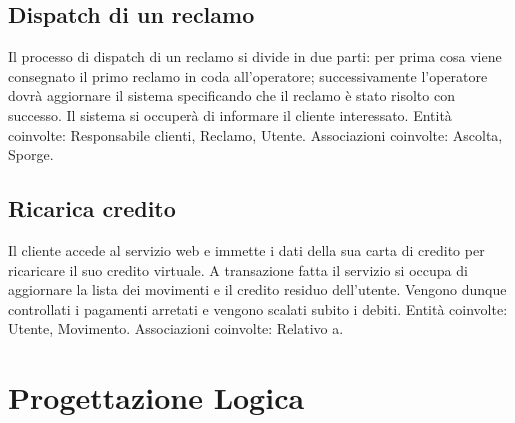 \documentclass[11pt,a4paper] {article}
\begin{document}
\subsection{Dispatch di un reclamo}
Il processo di dispatch di un reclamo si divide in due parti: per prima cosa viene consegnato il primo reclamo in coda all'operatore; successivamente l'operatore dovrà aggiornare il sistema specificando che il reclamo è stato risolto con successo. Il sistema si occuperà di informare il cliente interessato.
\newline
\newline
Entit\`a coinvolte: Responsabile clienti, Reclamo, Utente.
\newline
Associazioni coinvolte: Ascolta, Sporge.

\subsection{Ricarica credito}
Il cliente accede al servizio web e immette i dati della sua carta di credito per ricaricare il suo credito virtuale. A transazione fatta il servizio si occupa di aggiornare la lista dei movimenti e il credito residuo dell'utente. Vengono dunque controllati i pagamenti arretati e vengono scalati subito i debiti.
\newline
\newline
Entit\`a coinvolte: Utente, Movimento.
\newline
Associazioni coinvolte: Relativo a.

\section{Progettazione Logica}
\end{document}
